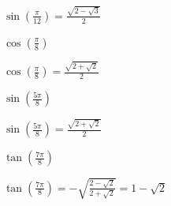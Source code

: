 \documentclass{ximera}
\begin{document}
\begin{question}
\begin{problem}
\begin{solution}
$\sin\left( \frac{\pi}{12} \right) = \frac{\sqrt{2-\sqrt{3}}}{2}$ 
\end{solution}
\end{problem}

\begin{problem}
$\cos \left( \frac{\pi}{8} \right)$

\begin{solution}
$\cos \left( \frac{\pi}{8} \right) = \frac{\sqrt{2 + \sqrt{2}}}{2}$
\end{solution}
\end{problem}

\begin{problem}
$\sin \left( \frac{5\pi}{8} \right)$

\begin{solution}
$\sin \left( \frac{5\pi}{8} \right) = \frac{\sqrt{2 + \sqrt{2}}}{2}$
\end{solution}
\end{problem}

\begin{problem}\label{idenhalfanglelast}
$\tan \left( \frac{7\pi}{8} \right)$ 

\begin{solution}
$\tan \left( \frac{7\pi}{8} \right) = -\sqrt{ \frac{2 - \sqrt{2}}{2 + \sqrt{2}} } =1-\sqrt{2}$
\end{solution}
\end{problem}

\end{question}
\end{document}
